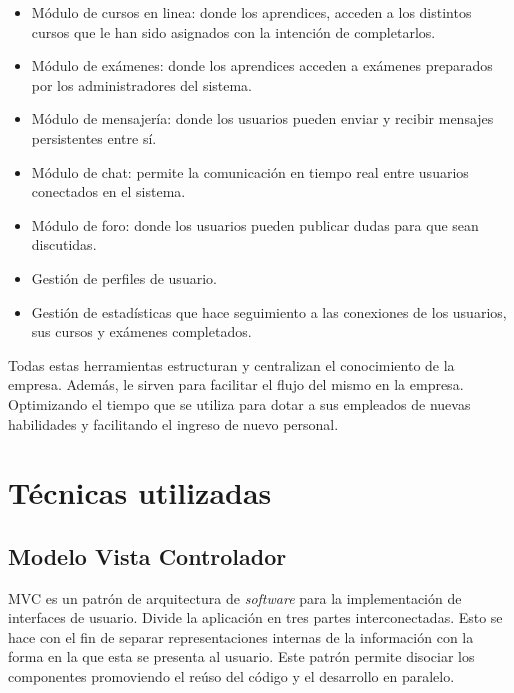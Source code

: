\begin{itemize}
	\item Módulo de cursos en linea: donde los aprendices, acceden a los distintos cursos que le han sido asignados con la intención de completarlos.

	\item Módulo de exámenes: donde los aprendices acceden a exámenes preparados por los administradores del sistema.

	\item Módulo de mensajería: donde los usuarios pueden enviar y recibir mensajes persistentes entre sí. 

	\item Módulo de chat: permite la comunicación en tiempo real entre usuarios conectados en el sistema.

	\item Módulo de foro: donde los usuarios pueden publicar dudas para que sean discutidas.

	\item Gestión de perfiles de usuario.

	\item Gestión de estadísticas que hace seguimiento a las conexiones de los usuarios, sus cursos y exámenes completados.
\end{itemize}

Todas estas herramientas estructuran y centralizan el conocimiento de la empresa. Además, le sirven para facilitar el flujo del mismo en la empresa. Optimizando el tiempo que se utiliza para dotar a sus empleados de nuevas habilidades y facilitando el ingreso de nuevo personal.

\section{Técnicas utilizadas}

\subsection{Modelo Vista Controlador}

\gls{MVC} es un patrón de arquitectura de \emph{software} para la implementación de interfaces de usuario. Divide la aplicación en tres partes interconectadas. Esto se hace con el fin de separar representaciones internas de la información con la forma en la que esta se presenta al usuario. Este patrón permite disociar los componentes promoviendo el reúso del código y el desarrollo en paralelo\cite{bib:mvc}.

